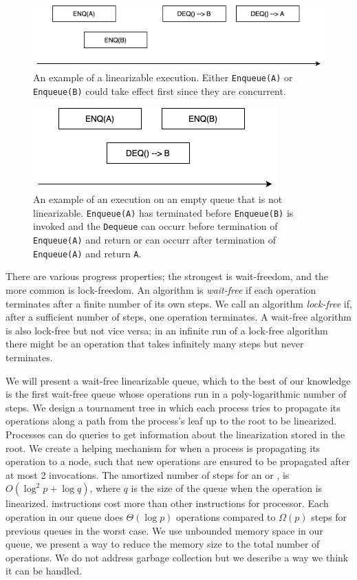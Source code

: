 \documentclass[10pt]{article}
\newcommand{\nf}[1]{{\normalfont{\texttt{#1}}}}
\theoremstyle{definition}
\begin{document}
\begin{figure}[hbt]
  \center\includegraphics[scale=0.5]{pics/good}
  \caption{\label{fig::goodexample}An example of a linearizable execution. Either \texttt{Enqueue(A)} or \texttt{Enqueue(B)} could take effect first since they are concurrent.}
\end{figure}

\begin{figure}[hbt]
  \center\includegraphics[scale=0.5]{pics/bad}
  \caption{\label{fig::badexample}An example of an execution on an empty queue that is not linearizable. \texttt{Enqueue(A)} has terminated before \texttt{Enqueue(B)} is invoked and the \texttt{Dequeue} can occurr before termination of \texttt{Enqueue(A)} and return \nf{null} or can occurr after termination of \texttt{Enqueue(A)} and return \texttt{A}.}
\end{figure}

There are various progress properties; the strongest is wait-freedom, and the more common is lock-freedom. An algorithm is \textit{wait-free} if each operation terminates after a finite number of its own steps. We call an algorithm \textit{lock-free} if, after a sufficient number of steps, one operation terminates. A wait-free algorithm is also lock-free but not vice versa; in an infinite run of a lock-free algorithm there might be an operation that takes infinitely many steps but never terminates.

We will present a wait-free linearizable queue, which to the best of our knowledge  is the first wait-free queue whose operations run in a poly-logarithmic number of steps. We design a tournament tree in which each process tries to propagate its operations along a path from the process's leaf up to the root to be linearized. Processes can do queries to get information about the linearization stored in the root. We create a helping mechanism for when a process is propagating its operation to a node, such that new operations are ensured to be propagated after at most 2 \nf{CAS} invocations. The amortized number of steps for an \nf{Enqueue} or \nf{Dequeue}, is $O(\log^2 p + \log q)$,  where $q$ is the size of the queue when the operation is linearized. \nf{CAS} instructions cost more than other instructions for processor. Each operation in our queue does $\Theta(\log p)$ \nf{CAS} operations compared to $\Omega(p)$ \nf{CAS} steps for previous queues in the worst case. We use unbounded memory space in our queue, we present a way to reduce the memory size to the total number of operations. We do not address garbage collection but we describe a way we think it can be handled.
\end{document}
